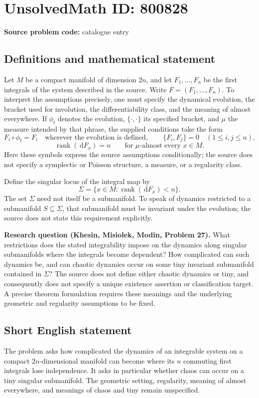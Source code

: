 \documentclass[11pt]{article}
\newcommand{\dd}{\,\mathrm{d}}
\begin{document}
\section*{UnsolvedMath ID: 800828}
\textbf{Source problem code:} catalogue entry
\subsection{Definitions and mathematical statement}
Let \(M\) be a compact manifold of dimension \(2n\), and let \(F_1,\ldots,F_n\) be the first integrals of the system described in the source. Write \(F=(F_1,\ldots,F_n)\). To interpret the assumptions precisely, one must specify the dynamical evolution, the bracket used for involution, the differentiability class, and the meaning of almost everywhere. If \(\phi_t\) denotes the evolution, \(\{\cdot,\cdot\}\) its specified bracket, and \(\mu\) the measure intended by that phrase, the supplied conditions take the form
\[
F_i\circ\phi_t=F_i\quad\text{wherever the evolution is defined},\qquad
\{F_i,F_j\}=0\quad(1\leq i,j\leq n),
\]
\[
\operatorname{rank}(\dd F_x)=n\qquad\text{for \(\mu\)-almost every }x\in M.
\]
Here these symbols express the source assumptions conditionally; the source does not specify a symplectic or Poisson structure, a measure, or a regularity class.

Define the singular locus of the integral map by
\[
\Sigma=\{x\in M:\operatorname{rank}(\dd F_x)<n\}.
\]
The set \(\Sigma\) need not itself be a submanifold. To speak of dynamics restricted to a submanifold \(S\subseteq\Sigma\), that submanifold must be invariant under the evolution; the source does not state this requirement explicitly.

\textbf{Research question (Khesin, Misiolek, Modin, Problem 27).} What restrictions does the stated integrability impose on the dynamics along singular submanifolds where the integrals become dependent? How complicated can such dynamics be, and can chaotic dynamics occur on some tiny invariant submanifold contained in \(\Sigma\)? The source does not define either chaotic dynamics or tiny, and consequently does not specify a unique existence assertion or classification target. A precise theorem formulation requires these meanings and the underlying geometric and regularity assumptions to be fixed.
\subsection{Short English statement}
The problem asks how complicated the dynamics of an integrable system on a compact \(2n\)-dimensional manifold can become where its \(n\) commuting first integrals lose independence. It asks in particular whether chaos can occur on a tiny singular submanifold. The geometric setting, regularity, meaning of almost everywhere, and meanings of chaos and tiny remain unspecified.
\end{document}
